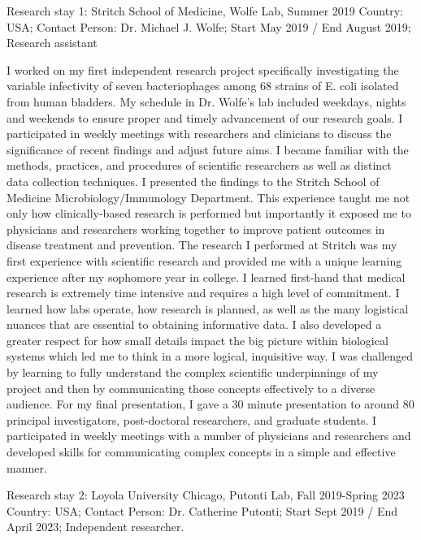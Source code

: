 {Research stay 1: Stritch School of Medicine, Wolfe Lab, Summer 2019
Country: USA; Contact Person: Dr. Michael J. Wolfe; Start May 2019 / End August 2019; Research assistant

I worked on my first independent research project specifically investigating the variable infectivity of seven bacteriophages among 68
strains of E. coli isolated from human bladders. My schedule in Dr. Wolfe’s lab included weekdays, nights and weekends to ensure proper
and timely advancement of our research goals. I participated in weekly meetings with researchers and clinicians to discuss the
significance of recent findings and adjust future aims. I became familiar with the methods, practices, and procedures of scientific
researchers as well as distinct data collection techniques. I presented the findings to the Stritch School of Medicine
Microbiology/Immunology Department.
This experience taught me not only how clinically-based research is performed but importantly it exposed me to physicians and
researchers working together to improve patient outcomes in disease treatment and prevention. The research I performed at Stritch was
my first experience with scientific research and provided me with a unique learning experience after my sophomore year in college. I
learned first-hand that medical research is extremely time intensive and requires a high level of commitment. I learned how labs operate,
how research is planned, as well as the many logistical nuances that are essential to obtaining informative data. I also developed a
greater respect for how small details impact the big picture within biological systems which led me to think in a more logical, inquisitive
way. I was challenged by learning to fully understand the complex scientific underpinnings of my project and then by communicating
those concepts effectively to a diverse audience. For my final presentation, I gave a 30 minute presentation to around 80 principal
investigators, post-doctoral researchers, and graduate students. I participated in weekly meetings with a number of physicians and
researchers and developed skills for communicating complex concepts in a simple and effective manner.


Research stay 2: Loyola University Chicago, Putonti Lab, Fall 2019-Spring 2023
Country: USA; Contact Person: Dr. Catherine Putonti; Start Sept 2019 / End April 2023; Independent researcher.

}
